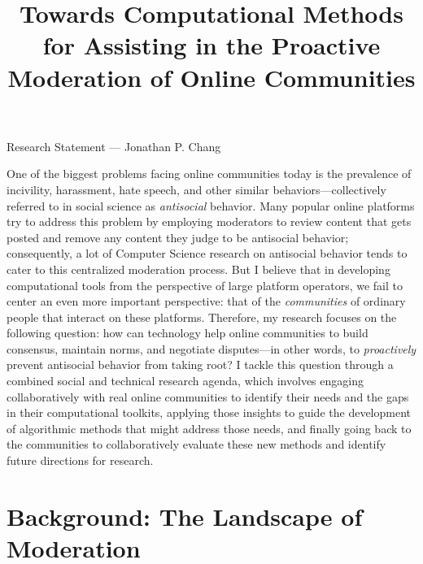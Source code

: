 \documentclass[11pt,letterpaper]{article}
\title{Towards Computational Methods for Assisting in the Proactive Moderation of Online Communities}
\begin{document}
\maketitle

\begin{center}
Research Statement --- Jonathan P. Chang
\end{center}

One of the biggest problems facing online communities today is the prevalence of incivility, harassment, hate speech, and other similar behaviors---collectively referred to in social science as \emph{antisocial} behavior.
Many popular online platforms try to address this problem by employing moderators to review content that gets posted and remove any content they judge to be antisocial behavior; consequently, a lot of Computer Science research on antisocial behavior tends to cater to this centralized moderation process.
But I believe that in developing computational tools from the perspective of large platform operators, we fail to center an even more important perspective: that of the \emph{communities} of ordinary people that interact on these platforms.
Therefore, my research focuses on the following question: how can technology help online communities to build consensus, maintain norms, and negotiate disputes---in other words, to \emph{proactively} prevent antisocial behavior from taking root?
I tackle this question through a combined social and technical research agenda, which involves engaging collaboratively with real online communities to identify their needs and the gaps in their computational toolkits, applying those insights to guide the development of algorithmic methods that might address those needs, and finally going back to the communities to collaboratively evaluate these new methods and identify future directions for research.

\section{Background: The Landscape of Moderation}
\end{document}
